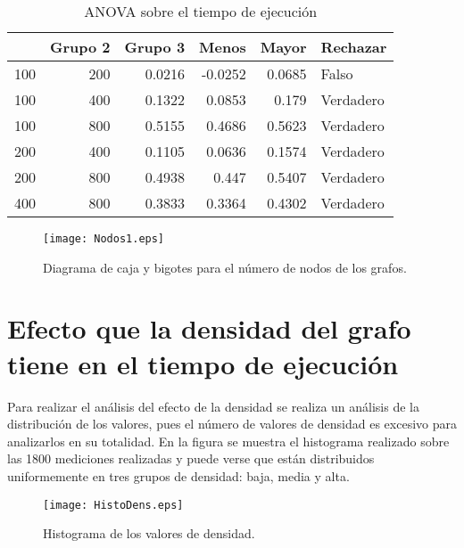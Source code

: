 \documentclass{article}
\begin{document}
\begin{table}[htbp]
  \centering
  \caption{ANOVA sobre el tiempo de ejecución}
    \begin{tabular}{|r|r|r|r|r|l|}
    \toprule
    \rowcolor[rgb]{ .357,  .608,  .835} \multicolumn{1}{|l|}{\textbf{Grupo 1}} & \multicolumn{1}{l|}{\textbf{Grupo 2}} & \multicolumn{1}{l|}{\textbf{Grupo 3}} & \multicolumn{1}{l|}{\textbf{Menos}} & \multicolumn{1}{l|}{\textbf{Mayor}} & \multicolumn{1}{l|}{\textbf{Rechazar}} \\
    \midrule
    100   & 200   & 0.0216 & -0.0252 & 0.0685 & Falso \\
     \midrule
    100   & 400   & 0.1322 & 0.0853 & 0.179 & Verdadero \\
     \midrule
    100   & 800   & 0.5155 & 0.4686 & 0.5623 & Verdadero \\
     \midrule
    200   & 400   & 0.1105 & 0.0636 & 0.1574 & Verdadero \\
     \midrule
    200   & 800   & 0.4938 & 0.447 & 0.5407 & Verdadero \\
     \midrule
    400   & 800   & 0.3833 & 0.3364 & 0.4302 & Verdadero \\
     \midrule
    \end{tabular}%
  \label{tab:Cuadro 3}
\end{table}


\begin{figure}
\begin{center}
  \texttt{[image: Nodos1.eps]}
\end{center}
\vspace*{-8mm}
\caption{Diagrama de caja y bigotes para el número de nodos de los grafos.}
  \label{Figura 4} 
\end{figure}

\section*{Efecto que la densidad del grafo tiene en el tiempo de ejecución}

Para realizar el análisis del efecto de la densidad se realiza un análisis de la distribución de los valores, pues el número de valores de densidad es excesivo para analizarlos en su totalidad. En la figura \pageref{Figura 5} se muestra el histograma realizado sobre las 1800 mediciones realizadas y puede verse que están distribuidos uniformemente en tres grupos de densidad: baja, media y alta.

\begin{figure}
\begin{center}
  \texttt{[image: HistoDens.eps]}
\end{center}
\vspace*{-8mm}
\caption{Histograma de los valores de densidad.}
  \label{Figura 5} 
\end{figure}
\end{document}
